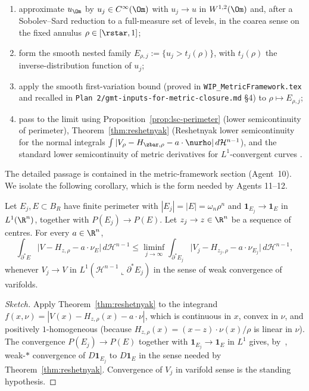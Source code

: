 \begin{enumerate}
   \item approximate $u_\Om$ by $u_j\in C^\infty(\Om)$ with $u_j\to
       u$ in $W^{1,2}(\Om)$ and, after a Sobolev--Sard reduction to a
       full-measure set of levels, in the coarea sense on the fixed
       annulus $\rho\in[\rstar,1]$;
   \item form the smooth nested family
       $E_{\rho,j}:=\{u_j>t_j(\rho)\}$, with $t_j(\rho)$ the
       inverse-distribution function of $u_j$;
   \item apply the smooth first-variation bound (proved in
       \texttt{WIP\_MetricFramework.tex} and recalled in
       \texttt{Plan 2/gmt-inputs-for-metric-closure.md} \S 4) to
       $\rho\mapsto E_{\rho,j}$;
   \item pass to the limit using Proposition~\ref{prop:lsc-perimeter}
       (lower semicontinuity of perimeter),
       Theorem~\ref{thm:reshetnyak} (Reshetnyak lower semicontinuity
       for the normal integrals
       $\int|V_\rho-H_{\zbar,\rho}-a\cdot\nurho|\,d\mathcal H^{n-1}$),
       and the standard lower semicontinuity of metric derivatives
       for $L^1$-convergent curves \cite[Thm.~2.2.1]{AGS2008}.
\end{enumerate}

The detailed passage is contained in the metric-framework section
(Agent~10).  We isolate the following corollary, which is the form
needed by Agents 11--12.

\begin{corollary}
\label{cor:reshetnyak-homot}
Let $E_j,E\subset B_R$ have finite perimeter with $|E_j|=|E|=
\omega_n\rho^n$ and $\mathbf 1_{E_j}\to\mathbf 1_E$ in $L^1(\R^n)$,
together with $P(E_j)\to P(E)$.  Let $z_j\to z\in\R^n$ be a sequence
of centres.  For every $a\in\R^n$,
\[
   \int_{\partial^*E}
      \bigl|V-H_{z,\rho}-a\cdot\nu_E\bigr|\,d\mathcal H^{n-1}
   \le\liminf_{j\to\infty}
   \int_{\partial^*E_j}
      \bigl|V_j-H_{z_j,\rho}-a\cdot\nu_{E_j}\bigr|\,d\mathcal H^{n-1},
\]
whenever $V_j\to V$ in $L^1(\mathcal H^{n-1}\llcorner\partial^*E_j)$ in
the sense of weak convergence of varifolds.
\end{corollary}

\begin{proof}[Sketch]
Apply Theorem~\ref{thm:reshetnyak} to the integrand
$f(x,\nu)=|V(x)-H_{z,\rho}(x)-a\cdot\nu|$, which is continuous in
$x$, convex in $\nu$, and positively $1$-homogeneous (because
$H_{z,\rho}(x)=(x-z)\cdot\nu(x)/\rho$ is linear in $\nu$).  The
convergence $P(E_j)\to P(E)$ together with $\mathbf 1_{E_j}\to
\mathbf 1_E$ in $L^1$ gives, by~\cite[Thm.~12.30]{Maggi2012}, weak-$*$
convergence of $D\mathbf 1_{E_j}$ to $D\mathbf 1_E$ in the sense
needed by Theorem~\ref{thm:reshetnyak}.  Convergence of $V_j$ in
varifold sense is the standing hypothesis.
\end{proof}

